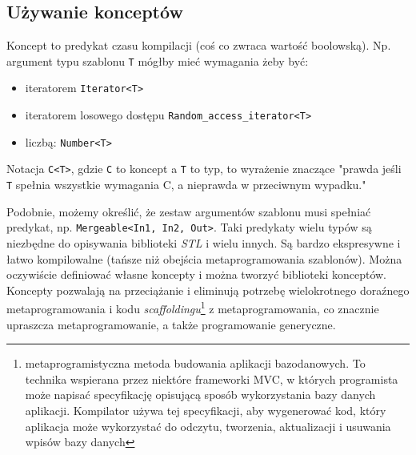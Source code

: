 \documentclass[11pt, a4paper]{article}
\begin{document}
\lstset{language=C++}

\subsection{Używanie konceptów}

Koncept to predykat czasu kompilacji (coś co zwraca wartość boolowską). Np. argument typu szablonu \verb#T# mógłby mieć wymagania żeby być:

\begin{itemize}

\item iteratorem \verb#Iterator<T>#

\item iteratorem losowego dostępu \verb#Random_access_iterator<T>#

\item liczbą: \verb#Number<T>#

\end{itemize}

Notacja \verb#C<T>#, gdzie \verb#C# to koncept a \verb#T# to typ, to wyrażenie znaczące "prawda jeśli \verb#T# spełnia wszystkie wymagania C, a nieprawda w przeciwnym wypadku."

Podobnie, możemy określić, że zestaw argumentów szablonu musi spełniać predykat, np. \verb#Mergeable<In1, In2, Out>#. Taki predykaty wielu typów są niezbędne do opisywania biblioteki \emph{STL} i wielu innych. Są bardzo ekspresywne i łatwo kompilowalne (tańsze niż obejścia metaprogramowania szablonów). Można oczywiście definiować własne koncepty i można tworzyć biblioteki konceptów. Koncepty pozwalają na przeciążanie i eliminują potrzebę wielokrotnego doraźnego metaprogramowania i kodu \emph{scaffoldingu}\footnote{metaprogramistyczna metoda budowania aplikacji bazodanowych. To technika wspierana przez niektóre frameworki MVC, w których programista może napisać specyfikację opisującą sposób wykorzystania bazy danych aplikacji. Kompilator używa tej specyfikacji, aby wygenerować kod, który aplikacja może wykorzystać do odczytu, tworzenia, aktualizacji i usuwania wpisów bazy danych } z metaprogramowania, co znacznie upraszcza metaprogramowanie, a także programowanie generyczne.
\end{document}
